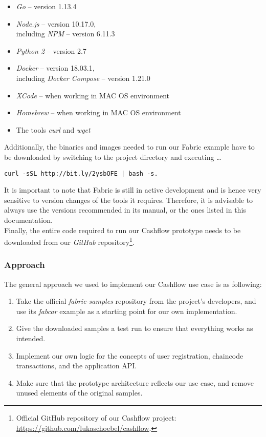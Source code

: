 \begin{itemize}
	\item \textit{Go} -- version 1.13.4 
	\item \textit{Node.js} -- version 10.17.0, \\ including \textit{NPM} -- version 6.11.3
	\item \textit{Python 2} -- version 2.7
	\item \textit{Docker} -- version 18.03.1, \\ including \textit{Docker Compose} -- version 1.21.0
	\item \textit{XCode} -- when working in MAC OS environment
	\item \textit{Homebrew} -- when working in MAC OS environment
	\item The tools \textit{curl} and \textit{wget}
\end{itemize} 
Additionally, the binaries and images needed to run our Fabric example have to be downloaded by switching to the project directory and executing \ldots
\begin{verbatim}
curl -sSL http://bit.ly/2ysbOFE | bash -s. 
\end{verbatim}
It is important to note that Fabric is still in active development and is hence very sensitive to version changes of the tools it requires. Therefore, it is advisable to always use the versions recommended in its manual, or the ones listed in this documentation. \\
Finally, the entire code required to run our Cashflow prototype needs to be downloaded from our \textit{GitHub} repository\footnote{Official GitHub repository of our Cashflow project:\\ \url{https://github.com/lukaschoebel/cashflow}. }. 

\subsubsection{Approach} \label{approach}
The general approach we used to implement our Cashflow use case is as following: 
\begin{enumerate}
	\item Take the official \textit{fabric-samples} repository from the project's developers, and use its \textit{fabcar} example as a starting point for our own implementation. 
	\item Give the downloaded samples a test run to ensure that everything works as intended. 
	\item Implement our own logic for the concepts of user registration, chaincode transactions, and the application API. 
	\item Make sure that the prototype architecture reflects our use case, and remove unused elements of the original samples. 
\end{enumerate}

